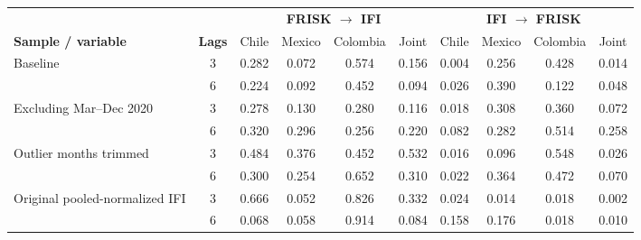 {\setlength{\tabcolsep}{3.5pt}
\begin{tabular}{@{} l c cccc cccc @{}}
\toprule
 & & \multicolumn{4}{c}{\textbf{FRISK $\to$ IFI}} & \multicolumn{4}{c}{\textbf{IFI $\to$ FRISK}} \\
\cmidrule(lr){3-6}\cmidrule(lr){7-10}
\textbf{Sample / variable} & \textbf{Lags} & Chile & Mexico & Colombia & Joint & Chile & Mexico & Colombia & Joint \\
\midrule
Baseline & 3 & 0.282 & 0.072 & 0.574 & 0.156 & 0.004 & 0.256 & 0.428 & 0.014 \\
 & 6 & 0.224 & 0.092 & 0.452 & 0.094 & 0.026 & 0.390 & 0.122 & 0.048 \\
Excluding Mar--Dec 2020 & 3 & 0.278 & 0.130 & 0.280 & 0.116 & 0.018 & 0.308 & 0.360 & 0.072 \\
 & 6 & 0.320 & 0.296 & 0.256 & 0.220 & 0.082 & 0.282 & 0.514 & 0.258 \\
Outlier months trimmed & 3 & 0.484 & 0.376 & 0.452 & 0.532 & 0.016 & 0.096 & 0.548 & 0.026 \\
 & 6 & 0.300 & 0.254 & 0.652 & 0.310 & 0.022 & 0.364 & 0.472 & 0.070 \\
Original pooled-normalized IFI & 3 & 0.666 & 0.052 & 0.826 & 0.332 & 0.024 & 0.014 & 0.018 & 0.002 \\
 & 6 & 0.068 & 0.058 & 0.914 & 0.084 & 0.158 & 0.176 & 0.018 & 0.010 \\
\bottomrule
\end{tabular}}